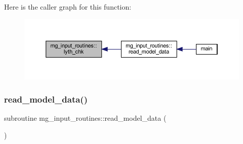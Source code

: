 Here is the caller graph for this function\+:
\nopagebreak
\begin{figure}[H]
\begin{center}
\leavevmode
\includegraphics[width=350pt]{namespacemg__input__routines_a9e1339657e87110a735f9631657c9019_icgraph}
\end{center}
\end{figure}
\mbox{\label{namespacemg__input__routines_acd1da063201ad2300b429047265d6c91}} 
\subsubsection{\texorpdfstring{read\+\_\+model\+\_\+data()}{read\_model\_data()}}
{\footnotesize\ttfamily subroutine mg\+\_\+input\+\_\+routines\+::read\+\_\+model\+\_\+data (\begin{DoxyParamCaption}{ }\end{DoxyParamCaption})}

